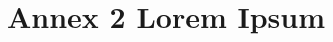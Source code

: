 

\chapter{Annex 2 Lorem Ipsum}
\label{ann:lorem_ipsum2}

\lipsum[1-100]
\lipsum[1-100]
\lipsum[1-100]
\lipsum[1-100]
